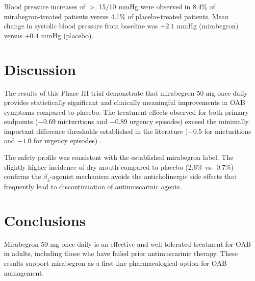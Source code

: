 \documentclass[
    language=english,
    doctype=clinical-report,
    institution=none,
]{../../omnilatex}
\begin{document}
Blood pressure increases of $>$ 15/10 mmHg were observed in 8.4\% of
mirabegron-treated patients versus 4.1\% of placebo-treated patients.
Mean change in systolic blood pressure from baseline was $+2.1$ mmHg
(mirabegron) versus $+0.4$ mmHg (placebo).

\section{Discussion}
\label{sec:discussion}

The results of this Phase III trial demonstrate that mirabegron 50 mg
once daily provides statistically significant and clinically meaningful
improvements in OAB symptoms compared to placebo. The treatment effects
observed for both primary endpoints ($-0.69$ micturitions and $-0.89$
urgency episodes) exceed the minimally important difference thresholds
established in the literature ($-0.5$ for micturitions and $-1.0$ for
urgency episodes) \cite{noble2016defining}.

The safety profile was consistent with the established mirabegron label.
The slightly higher incidence of dry mouth compared to placebo (2.6\%
vs.\ 0.7\%) confirms the $\beta_3$-agonist mechanism avoids the
anticholinergic side effects that frequently lead to discontinuation
of antimuscarinic agents.

\section{Conclusions}
\label{sec:conclusions}

Mirabegron 50 mg once daily is an effective and well-tolerated treatment
for OAB in adults, including those who have failed prior antimuscarinic
therapy. These results support mirabegron as a first-line pharmacological
option for OAB management.



\end{document}

